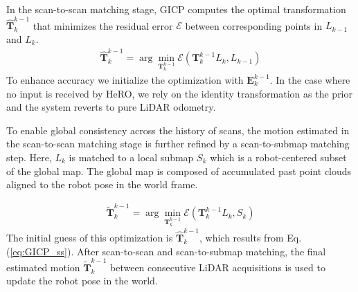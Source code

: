 \documentclass[letterpaper, 10pt, conference]{ieeeconf}      %
\newcommand{\rev}[1]{{\color{blue}#1}} %
\begin{document}
In the scan-to-scan matching stage, GICP computes the optimal transformation $\hat{\textbf{T}}^{k-1}_{k}$ that minimizes the residual error $\mathcal{E}$ between corresponding points in $L_{k-1}$ and $L_{k}$. 
\begin{align}\label{eq:GICP_ss}
\hat{\textbf{T}}^{k-1}_{k} = \arg\min_{\textbf{T}^{k-1}_{k}} \mathcal{E} (\textbf{T}^{k-1}_{k}L_{k}, L_{k-1})
\end{align}
To enhance accuracy we initialize the optimization with $\textbf{E}^{k-1}_{k}$. In the case where no input is received by HeRO, we rely on the identity transformation as the prior and the system reverts to pure LiDAR odometry. 


To enable global consistency across the history of scans, the motion estimated in the scan-to-scan matching stage is further refined by a scan-to-submap matching step. 
Here, $L_k$ is matched to a local submap $S_k$ which is a robot-centered subset of the global map.  The global map is composed of accumulated past point clouds aligned to the robot pose in the world frame.



\begin{align}\label{eq:GICP_map}
\tilde{\textbf{T}}^{k-1}_{k} = \arg\min_{\textbf{T}^{k-1}_{k}} \mathcal{E} (\textbf{T}^{k-1}_{k}L_{k}, S_{k})
\end{align}
The initial guess of this optimization is $\hat{\textbf{T}}^{k-1}_{k}$, which results from Eq. (\ref{eq:GICP_ss}).
After scan-to-scan and scan-to-submap matching, the final estimated motion $\tilde{\textbf{T}}^{k-1}_{k}$ between consecutive LiDAR acquisitions is used to update the robot pose in the world.%
\end{document}
